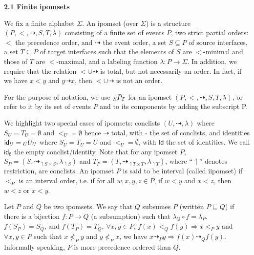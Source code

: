 \par\medskip\noindent\textbf{2.1 Finite ipomsets}\par
 
 
We fix a finite alphabet $\Sigma$. An ipomset (over $\Sigma$) is a structure $(P,{<},{\dashrightarrow},S,T,\lambda)$ consisting of a finite set of events $P$, two strict partial orders: $<$ the precedence order, and $\dashrightarrow$ the event order, a set $S\subseteq P$ of source interfaces, a set $T\subseteq P$ of target interfaces such that the elements of $S$ are $<$-minimal and those of $T$ are $<$-maximal, and a labeling function $\lambda:P\to\Sigma$. In addition, we require that the relation ${<}\cup{\dashrightarrow}$ is total, but not necessarily an order. In fact, if we have $x<y$ and $y\dashrightarrow x$, then ${<}\cup{\dashrightarrow}$ is not an order.\par
 
 
 
For the purpose of notation, we use ${\vphantom{P}}_{S}P_{T}$ for an ipomset $(P,<,\dashrightarrow,S,T,\lambda)$, or refer to it by its set of events $P$ and to its components by adding the subscript P.\par
 
 
 
We highlight two special cases of ipomsets: conclists $(U,\dashrightarrow,\lambda)$ where $S_{U}=T_{U}=\emptyset$ and $<_{U}=\emptyset$ hence $\dashrightarrow$ total, with $\square$ the set of conclists, and identities $\mathsf{id}_{U}={\vphantom{U}}_{U}U_{U}$ where $S_{U}=T_{U}=U$ and $<_{U}=\emptyset$, with $\mathsf{Id}$ the set of identities. We call $\mathsf{id}_{\emptyset}$ the empty conclist/identity. Note that for any ipomset $P$, $S_{P}=(S,{\dashrightarrow_{\upharpoonleft S\times S}},\lambda_{\upharpoonleft S})$ and $T_{P}=(T,{\dashrightarrow_{\upharpoonleft T\times T}},\lambda_{\upharpoonleft T})$, where “\ensuremath{\upharpoonleft}” denotes restriction, are conclists. An ipomset $P$ is said to be interval (called iipomset) if $<_{P}$ is an interval order, i.e. if for all $w,x,y,z\in P$, if $w<y$ and $x<z$, then $w<z$ or $x<y$.\par
 
 
 
Let $P$ and $Q$ be two ipomsets. We say that $Q$ subsumes $P$ (written $P\sqsubseteq Q$) if there is a bijection $f:P\to Q$ (a subsumption) such that $\lambda_{Q}\circ f=\lambda_{P}$, $f(S_{P})=S_{Q}$, and $f(T_{P})=T_{Q}$, $\forall x,y\in P,\,f(x)<_{Q}f(y)\Rightarrow x<_{P}y$ and $\forall x,y\in P$ such that $x\nless_{P}y$ and $y\nless_{P}x$, we have $x\dashrightarrow_{P}y\Rightarrow f(x)\dashrightarrow_{Q}f(y)$. Informally speaking, $P$ is more precedence ordered than $Q$.\par
 
